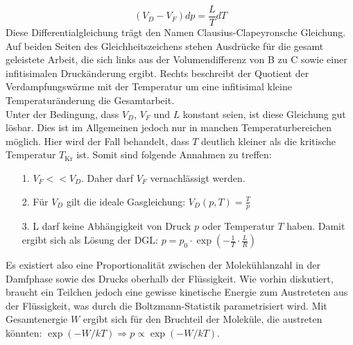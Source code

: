 \begin{equation}
    (V_D-V_F)dp=\frac{L}{T}dT
\end{equation}
Diese Differentialgleichung trägt den Namen Clausius-Clapeyronsche Gleichung.
Auf beiden Seiten des Gleichheitszeichens stehen Ausdrücke für die gesamt
geleistete Arbeit, die sich links aus der Volumendifferenz von B zu C sowie einer infitisimalen
Druckänderung ergibt.
Rechts beschreibt der Quotient der Verdampfungswärme mit der Temperatur um eine infitisimal kleine
Temperaturänderung die Gesamtarbeit.\\
Unter der Bedingung, dass $V_D$, $V_F$ und $L$ konstant seien, ist diese Gleichung gut lösbar. Dies ist im 
Allgemeinen jedoch nur in manchen Temperaturbereichen möglich. Hier wird der Fall behandelt, dass $T$ deutlich kleiner 
als die kritische Temperatur $T_\text{Kr}$ ist. 
\newpage
Somit sind folgende Annahmen zu treffen:
\begin{itemize}
    \item[1.] $V_F<<V_D$. Daher darf $V_F$ vernachlässigt werden.
    \item[2.] Für $V_D$ gilt die ideale Gasgleichung: $V_D(p,T)=\frac{T}{p}$
    \item[3.] L darf keine Abhängigkeit von Druck $p$ oder Temperatur $T$ haben. Damit 
    ergibt sich als Lösung der DGL: $p=p_0\cdot \exp(-\frac{1}{T}\cdot\frac{L}{R})$
\end{itemize} 
Es existiert also eine Proportionalität zwischen der Molekühlanzahl in der Damfphase sowie
des Drucks oberhalb der Flüssigkeit. Wie vorhin diskutiert, braucht ein Teilchen jedoch eine gewisse 
kinetische Energie zum Austreteten aus der Flüssigkeit, was durch die Boltzmann-Statistik parametrisiert wird.
Mit Gesamtenergie $W$ ergibt sich für den Bruchteil der Moleküle, die austreten könnten:
$\exp(-W/kT)\Rightarrow p\propto \exp(-W/kT)$.

